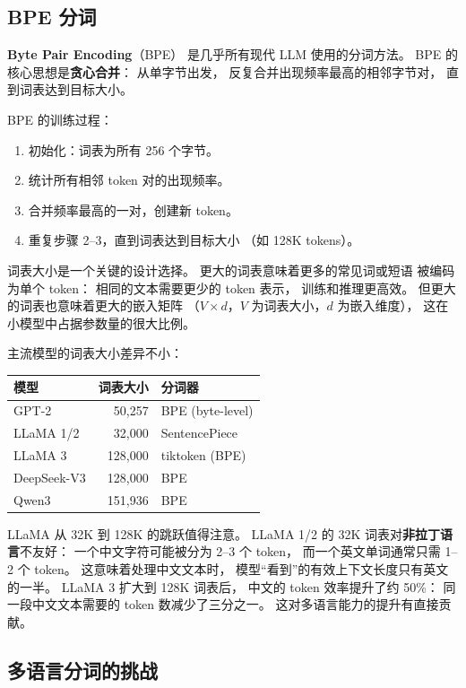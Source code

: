 \subsection{BPE 分词}

\textbf{Byte Pair Encoding}（BPE）
是几乎所有现代 LLM 使用的分词方法。
BPE 的核心思想是\textbf{贪心合并}：
从单字节出发，
反复合并出现频率最高的相邻字节对，
直到词表达到目标大小。

BPE 的训练过程：
\begin{enumerate}[noitemsep]
  \item 初始化：词表为所有 256 个字节。
  \item 统计所有相邻 token 对的出现频率。
  \item 合并频率最高的一对，创建新 token。
  \item 重复步骤 2--3，直到词表达到目标大小
        （如 128K tokens）。
\end{enumerate}

词表大小是一个关键的设计选择。
更大的词表意味着更多的常见词或短语
被编码为单个 token：
相同的文本需要更少的 token 表示，
训练和推理更高效。
但更大的词表也意味着更大的嵌入矩阵
（$V \times d$，$V$ 为词表大小，$d$ 为嵌入维度），
这在小模型中占据参数量的很大比例。

主流模型的词表大小差异不小：

\begin{center}\small
\renewcommand{\arraystretch}{1.3}
\begin{tabular}{lrl}
\toprule
\rowcolor{figLightGray}
\textbf{模型} & \textbf{词表大小} & \textbf{分词器} \\
\midrule
GPT-2 & 50,257 & BPE (byte-level) \\
LLaMA 1/2 & 32,000 & SentencePiece \\
LLaMA 3 & 128,000 & tiktoken (BPE) \\
DeepSeek-V3 & 128,000 & BPE \\
Qwen3 & 151,936 & BPE \\
\bottomrule
\end{tabular}
\end{center}

LLaMA 从 32K 到 128K 的跳跃值得注意。
LLaMA 1/2 的 32K 词表对\textbf{非拉丁语言}不友好：
一个中文字符可能被分为 2--3 个 token，
而一个英文单词通常只需 1--2 个 token。
这意味着处理中文文本时，
模型“看到”的有效上下文长度只有英文的一半。
LLaMA 3 扩大到 128K 词表后，
中文的 token 效率提升了约 50\%：
同一段中文文本需要的 token 数减少了三分之一。
这对多语言能力的提升有直接贡献。

\subsection{多语言分词的挑战}


